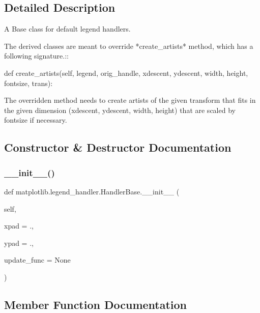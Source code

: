 \subsection{Detailed Description}
\begin{DoxyVerb}A Base class for default legend handlers.

The derived classes are meant to override *create_artists* method, which
has a following signature.::

  def create_artists(self, legend, orig_handle,
                     xdescent, ydescent, width, height, fontsize,
                     trans):

The overridden method needs to create artists of the given
transform that fits in the given dimension (xdescent, ydescent,
width, height) that are scaled by fontsize if necessary.\end{DoxyVerb}
 

\subsection{Constructor \& Destructor Documentation}
\mbox{\label{classmatplotlib_1_1legend__handler_1_1HandlerBase_a5d635ce240558604bd57cd841cc101b2}} 
\subsubsection{\texorpdfstring{\+\_\+\+\_\+init\+\_\+\+\_\+()}{\_\_init\_\_()}}
{\footnotesize\ttfamily def matplotlib.\+legend\+\_\+handler.\+Handler\+Base.\+\_\+\+\_\+init\+\_\+\+\_\+ (\begin{DoxyParamCaption}\item[{}]{self,  }\item[{}]{xpad = {.},  }\item[{}]{ypad = {.},  }\item[{}]{update\+\_\+func = {\ttfamily None} }\end{DoxyParamCaption})}



\subsection{Member Function Documentation}
\mbox{\label{classmatplotlib_1_1legend__handler_1_1HandlerBase_aff7f166b8af0935e3d1cded5853a38d2}} 
